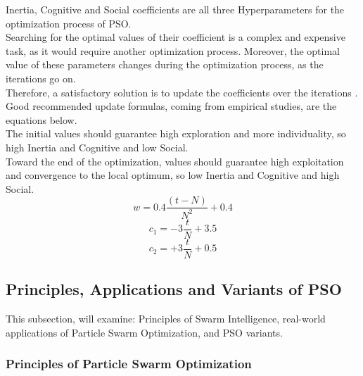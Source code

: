 Inertia, Cognitive and Social coefficients are all three Hyperparameters for the optimization process of PSO.
\\[0.3cm]Searching for the optimal values of their coefficient is a complex and expensive task, as it would require another optimization process.
Moreover, the optimal value of these parameters changes during the optimization process, as the iterations go on.
\\[0.3cm]Therefore, a satisfactory solution is to update the coefficients over the iterations \cite{Tesi-3.2}.
Good recommended update formulas, coming from empirical studies, are the equations below.
\\[0.3cm]The initial values should guarantee high exploration and more individuality, so high Inertia and Cognitive and low Social.
\\[0.3cm]Toward the end of the optimization, values should guarantee high exploitation and convergence to the local optimum, so low Inertia and Cognitive and high Social.
\begin{equation}
	w = 0.4\frac{(t-N)}{N^2} + 0.4
\end{equation}
\begin{equation}
	c_1 = -3\frac{t}{N} + 3.5
\end{equation}
\begin{equation}
	c_2 = +3\frac{t}{N} + 0.5
\end{equation}

\subsection{Principles, Applications and Variants of PSO}

This subsection, will examine: Principles of Swarm Intelligence, real-world applications of Particle Swarm Optimization, and PSO variants.

\subsubsection{Principles of Particle Swarm Optimization}

